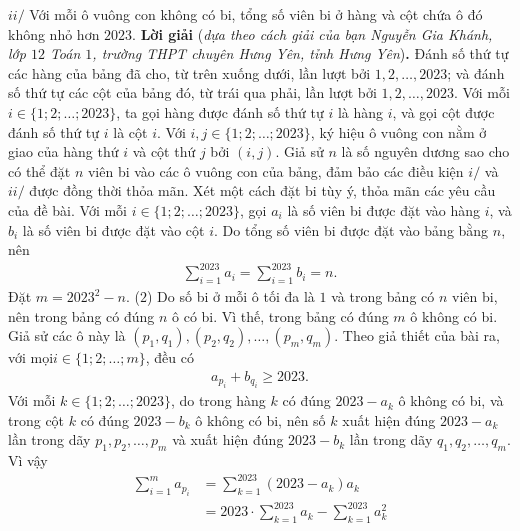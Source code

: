 \begin{multicols}{2}
	\vskip 0.05cm
	$ii/$ Với mỗi ô vuông con không có bi, tổng số viên bi ở hàng và cột chứa ô đó không nhỏ hơn $2023$.
	\vskip 0.05cm
	\textbf{\color{thachthuctoanhoc}Lời giải} (\textit{dựa theo cách giải của bạn Nguyễn Gia Khánh, lớp $12$ Toán $1$, trường THPT chuyên Hưng Yên, tỉnh Hưng Yên})\textbf{\color{thachthuctoanhoc}.}
	\vskip 0.05cm
	Đánh số thứ tự các hàng của bảng đã cho, từ trên xuống dưới, lần lượt bởi $1, 2, \ldots, 2023$; và đánh số thứ tự các cột của bảng đó, từ trái qua phải, lần lượt bởi $1, 2, \ldots, 2023$.
	\vskip 0.05cm
	Với mỗi $i \in  \{1; 2; \ldots; 2023\}$, ta gọi hàng được đánh số thứ tự $i$ là hàng $i$, và gọi cột được đánh số thứ tự $i$ là cột $i$.
	\vskip 0.05cm
	Với $i, j \in \{1; 2; \ldots; 2023\}$, ký hiệu ô vuông con nằm ở giao của hàng thứ $i$ và cột thứ $j$ bởi $(i, j)$.
	\vskip 0.05cm
	Giả sử $n$ là số nguyên dương sao cho có thể đặt $n$ viên bi vào các ô vuông con của bảng, đảm bảo các điều kiện $i/$ và $ii/$ được đồng thời thỏa mãn.
	\vskip 0.05cm
	Xét một cách đặt bi tùy ý, thỏa mãn các yêu cầu của đề bài.
	\vskip 0.05cm
	Với mỗi $i \in \{1; 2; \ldots; 2023\}$, gọi $a_i$  là số viên bi được đặt vào hàng $i$, và  $b_i$ là số viên bi được đặt vào cột $i$.
	\vskip 0.05cm
	Do tổng số viên bi được đặt vào bảng bằng $n$, nên
	\begin{align*}
		\sum\limits_{i = 1}^{2023} {{a_i}}  = \sum\limits_{i = 1}^{2023} {{b_i}}  = n. \tag{$1$}
	\end{align*}
	Đặt $m = 2023^2 -n$. \hfill    ($2$)
	\vskip 0.05cm
	Do số bi ở mỗi ô tối đa là $1$ và trong bảng có $n$ viên bi, nên trong bảng có đúng $n$ ô có bi. Vì thế, trong bảng có đúng $m$ ô không có bi. Giả sử các ô này là $(p_1,q_1), (p_2,q_2), \ldots, (p_m,q_m)$.
	\vskip 0.05cm 
	Theo giả thiết của bài ra, với mọi\linebreak $i \in \{1; 2; \ldots; m\}$, đều có
	\begin{align*}
		{a_{{p_i}}} + {b_{{q_i}}} \ge 2023. \tag{$3$}
	\end{align*}
	Với mỗi $k \in \{1; 2; \ldots; 2023\}$, do trong hàng $k$ có đúng $2023 - a_k$  ô không có bi, và trong cột $k$ có đúng $2023-b_k$  ô không có bi, nên số $k$ xuất hiện đúng $2023- a_k$  lần trong dãy $p_1,p_2,\ldots,p_m$  và xuất hiện đúng $2023-b_k$  lần trong dãy $q_1, q_2,\ldots,q_m$.
	\vskip 0.05cm 
	Vì vậy
	\begin{align*}
		\sum\limits_{i = 1}^m {{a_{{p_i}}}} & = \sum\limits_{k = 1}^{2023} {\left( {2023 - {a_k}} \right){a_k}} \\
		& = 2023 \cdot \sum\limits_{k = 1}^{2023} {{a_k}}  - \sum\limits_{k = 1}^{2023} {a_k^2}  \\

\end{align*}
\end{multicols}
